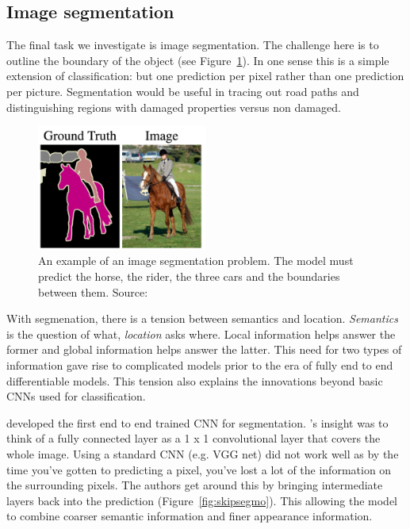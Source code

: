 \documentclass[12pt, a4paper, oneside, headinclude, footinclude]{article}
\begin{document}
\subsection{Image segmentation}

The final task we investigate is image segmentation. The challenge here is to
outline the boundary of the object (see Figure~\ref{fig:segmo}). In one sense this is a
simple extension of classification: but one prediction per pixel rather than
one prediction per picture. Segmentation would be useful in tracing out road
paths and distinguishing regions with damaged properties versus non damaged. 

\begin{figure}
    \centering
\includegraphics[width=0.5\textwidth]{Figures/segmentation-example.png}
\caption[An example of an image segmentation problem]{An example of an image
    segmentation problem. The model must predict the horse, the rider, the
    three cars and the boundaries between them. Source:~\cite{long2015fully}
\label{fig:segmo}} \end{figure}

With segmenation, there is a tension between semantics and location.
\textit{Semantics} is the question of what, \textit{location} asks where.
Local information helps answer the former and global information helps answer
the latter. This need for two types of information gave rise to complicated
models prior to the era of fully end to end differentiable models. This
tension also explains the innovations beyond basic CNNs used for
classification.

\cite{long2015fully} developed the first end to end trained CNN for
segmentation. \cite{long2015fully}'s insight was to think of
a fully connected layer as a 1 x 1 convolutional layer that covers the whole
image. Using a standard CNN (e.g. VGG net) did not work well as by the
time you've gotten to predicting a pixel, you've lost a lot of the information
on the surrounding pixels. The authors get around this by bringing
intermediate layers back into the prediction (Figure~\ref{fig:skipsegmo}).
This allowing the model to combine coarser semantic information and finer
appearance information. 
\end{document}
